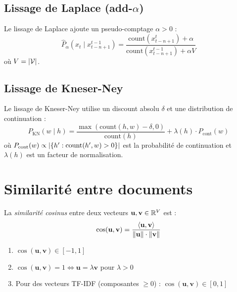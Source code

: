 \subsection{Lissage de Laplace (add-$\alpha$)}

\begin{definition}
Le lissage de Laplace ajoute un pseudo-comptage $\alpha > 0$ :
\[
\hat{P}_\alpha(x_t \mid x_{t-n+1}^{t-1}) = \frac{\text{count}(x_{t-n+1}^t) + \alpha}{\text{count}(x_{t-n+1}^{t-1}) + \alpha V}
\]
o\`u $V = \left| \mathcal{V} \right|$.
\end{definition}

\subsection{Lissage de Kneser-Ney}

\begin{definition}
Le lissage de Kneser-Ney utilise un discount absolu $\delta$ et une distribution
de continuation :
\[
P_{\text{KN}}(w \mid h) = \frac{\max(\text{count}(h, w) - \delta, 0)}{\text{count}(h)} + \lambda(h) \cdot P_{\text{cont}}(w)
\]
o\`u $P_{\text{cont}}(w) \propto \left| \{h' : \text{count}(h', w) > 0\} \right|$
est la probabilit\'e de continuation et $\lambda(h)$ est un facteur de
normalisation.
\end{definition}

\section{Similarit\'e entre documents}
\label{sec:rep:similarite}

\begin{definition}
La \emph{similarit\'e cosinus} entre deux vecteurs $\mathbf{u}, \mathbf{v} \in \mathbb{R}^V$ est :
\[
\cos(\mathbf{u}, \mathbf{v}) = \frac{\langle \mathbf{u}, \mathbf{v} \rangle}{\left\| \mathbf{u} \right\| \cdot \left\| \mathbf{v} \right\|}
\]
\end{definition}

\begin{proposition}
\begin{enumerate}
    \item $\cos(\mathbf{u}, \mathbf{v}) \in [-1, 1]$
    \item $\cos(\mathbf{u}, \mathbf{v}) = 1 \iff \mathbf{u} = \lambda \mathbf{v}$
          pour $\lambda > 0$
    \item Pour des vecteurs TF-IDF (composantes $\geq 0$) :
          $\cos(\mathbf{u}, \mathbf{v}) \in [0, 1]$
\end{enumerate}
\end{proposition}

